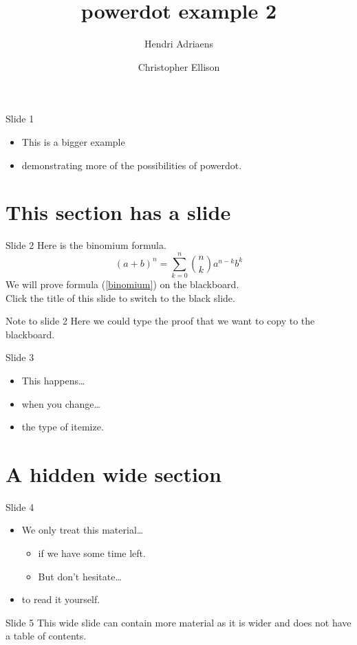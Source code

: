 \documentclass[
  size=12pt,
  style=ikeda,
  paper=screen,
  pauseslide,
  nohandoutpagebreaks,
  fleqn
]{powerdot}
\title{powerdot example 2}
\author{Hendri Adriaens\and Christopher Ellison}
\begin{document}
\maketitle

\begin{slide}{Slide 1}
  \begin{itemize}
    \item This is a bigger example\pause
    \item demonstrating more of the possibilities of powerdot.
  \end{itemize}
\end{slide}

\section{This section has a slide}

\begin{slide}{Slide 2}
  Here is the binomium formula.\pause
  \begin{equation}\label{binomium}
    (a+b)^n=\sum_{k=0}^n{n\choose k}a^{n-k}b^k
  \end{equation}\pause
  We will prove formula (\ref{binomium}) on the blackboard.\\
  Click the title of this slide to switch to the black slide.
\end{slide}

\begin{note}{Note to slide 2}
  Here we could type the proof that
  we want to copy to the blackboard.
\end{note}

\begin{slide}{Slide 3}
  \begin{itemize}[type=1]
    \item This happens\dots\pause
    \item when you change\dots\pause
    \item the type of itemize.
  \end{itemize}
\end{slide}

\section[template=wideslide,tocsection=hidden]{A hidden wide section}

\begin{slide}{Slide 4}
  \begin{itemize}
    \item We only treat this material\dots\pause
    \begin{itemize}
      \item if we have some time left.\pause
      \item But don't hesitate\dots\pause
    \end{itemize}
    \item to read it yourself.
  \end{itemize}
\end{slide}

\begin{wideslide}{Slide 5}
  This wide slide can contain more material
  as it is wider and does not have a table
  of contents.
\end{wideslide}
\end{document}
